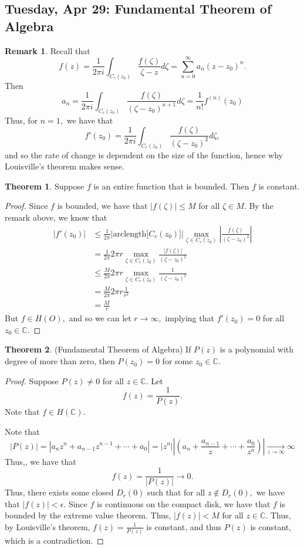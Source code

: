 \documentclass[10pt, oneside]{article}
\newcommand{\bbC}{\mathbb{C}}
\theoremstyle{definition}
\newtheorem{thm}{Theorem}
\newtheorem{rem}{Remark}
\newcommand{\bbC}{\mathbb{C}}
\begin{document}
\newpage
\subsection{Tuesday, Apr 29: Fundamental Theorem of Algebra}
\begin{rem}
    Recall that 
    \[f(z) = \frac{1}{2\pi i }\int_{C_r(z_0)}\frac{f(\zeta)}{\zeta - z}d\zeta = \sum_{n=0}^\infty a_n (z- z_0)^n.\] Then
    \[a_n = \frac{1}{2\pi i}\int_{C_{r}(z_0)}\frac{f(\zeta)}{(\zeta - z_0)^{n+1}}d\zeta = \frac{1}{n!}f^{(n)}(z_0)\]
Thus, for $n = 1,$ we have that 
\[f'(z_0) = \frac{1}{2\pi i} \int_{C_r(z_0)}\frac{f(\zeta)}{(\zeta- z_0)^2}d\zeta,\] and so the rate of change is dependent on the size of the function, hence why Louisville's theorem makes sense.
\end{rem}
\begin{thm}
    Suppose $f$ is an entire function that is bounded. Then $f$ is constant.
\end{thm}
\begin{proof}
Since $f$ is bounded, we have that $|f(\zeta)| \leq M$ for all $\zeta\in M.$
    By the remark above, we know that 
    \begin{align*}
        |f
        '(z_0)| &\leq \frac{1}{2\pi }\big|\text{arclength}\big[C_r(z_0)\big]\big| \max_{\zeta \in C_r(z_0)} |\frac{f(\zeta)}{(\zeta - z_0)^2}|\\
        &= \frac{1}{2\pi }2\pi r   \max_{\zeta \in C_r(z_0)} \frac{|f(\zeta)|}{(\zeta - z_0)^2}\\
        &\leq \frac{M}{2\pi }2\pi  r  \max_{\zeta \in C_r(z_0)} \frac{1}{(\zeta - z_0)^2}\\
        &= \frac{M}{2\pi }2\pi r \frac{1}{r^2}\\
        &= \frac{M}{r}
    \end{align*}
    But $f \in H(O),$ and so we can let $r\to \infty,$ implying that $f'(z_0) = 0$ for all $z_0 \in \bbC.$
\end{proof}

\begin{thm}
    (Fundamental Theorem of Algebra) If $P(z)$ is a polynomial with degree of more than zero, then $P(z_0) = 0$ for some $z_0 \in \bbC.$
\end{thm}
\begin{proof}
    Suppose $P(z) \neq 0$ for all $z \in \bbC.$ Let 
    \[f(z) = \frac{1}{P(z)}.\] Note that $f \in H(\bbC).$ 

    Note that 
    \[|P(z)| = |a_nz^n + a_{n-1}z^{n-1} + \cdots + a_0| = |z^n|\left|(a_n + \frac{a_{n-1}}{z} + \cdots + \frac{a_0}{z^n})\right| \xrightarrow[z\to \infty]{} \infty\] Thus,, we have that 
    \[f(z) = \frac{1}{|P(z)|}\to 0.\] Thus, there exists some closed $D_r(0)$ such that for all $z\notin D_r(0),$ we have that $|f(z)| < \epsilon.$ Since $f$ is continuous on the compact disk, we have that $f$ is bounded by the extreme value theorem. Thus, $|f(z)| < M$ for all $z\in \bbC.$ Thus, by Louisville's theorem, $f(z) = \frac{1}{P(z)}$ is constant, and thus $P(z)$ is constant, which is a contradiction.
\end{proof}
\end{document}

